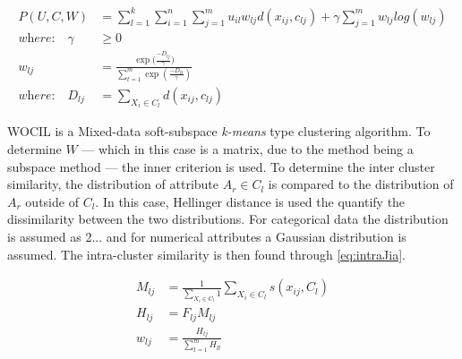\documentclass[../report.tex]{subfiles}
\begin{document}
\begin{align}
  P(U,C,W) &= \sum^k_{l=1} \sum^n_{i=1} \sum^m_{j=1} u_{il} w_{ lj } d(x_{ij},c_{lj}) + \gamma \sum_{j=1}^{m}{ w_{lj} log (w_{lj}) } \\
\textit{where:}\quad\gamma&\geq 0 \\
\label{eq:ewkm}
	w_{lj} &= \frac{\exp({\frac{-D_{lj}}{\gamma})}}{\sum_{t=1}^{m}{\exp{(\frac{-D_{lt}}{\gamma})}}} \\
\textit{where:}\quad D_{ lj } &= \sum_{X_i \in C_l}{d(x_{ij},c_{ lj })}
\end{align}

WOCIL \cite{Jia2018} is a Mixed-data soft-subspace \textit{k-means} type clustering algorithm.
To determine $W$ --- which in this case is a matrix, due to the method being a subspace method --- the inner criterion is used. To determine the inter cluster similarity, the distribution of attribute $A_r \in C_l$ is compared to the distribution of $A_r$ outside of $C_l$. In this case, Hellinger distance is used the quantify the dissimilarity between the two distributions. For categorical data the distribution is assumed as 2... and for numerical attributes a Gaussian distribution is assumed. The intra-cluster similarity is then found through \ref{eq:intraJia}.

\begin{align}
  M_{lj} &= \frac{1}{\sum_{X_i \in C_{l}}{1}} \sum_{X_i \in C_{l}}{s(x_{ ij }, C_l)} \\
\label{eq:intraJia}
 H_{ lj } &= F_{ lj} M_{ lj } \\
  w_{lj} & = \frac{H_{lj}}{\sum_{t = 1}^{m}{H_{lt}}}
\label{eq:Jiaweight}
\end{align}


\end{document}
